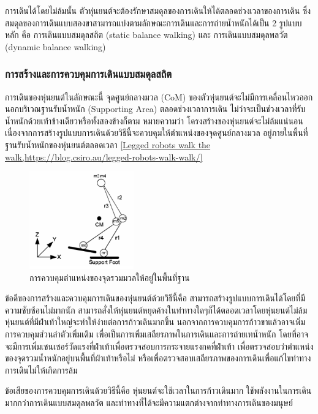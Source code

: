 การเดินได้โดยไม่ล้มนั้น ตัวหุ่นยนต์จะต้องรักษาสมดุลของการเดินให้ได้ตลอดช่วงเวลาของการเดิน
ซึ่งสมดุลของการเดินแบบสองขาสามารถแบ่งตามลักษณะการเดินและการถ่ายน้ำหนักได้เป็น 2 รูปแบบหลัก คือ 
การเดินแบบสมดุลสถิต (static balance walking) และ การเดินแบบสมดุลพลวัต (dynamic balance walking)

\subsubsection{การสร้างและการควบคุมการเดินแบบสมดุลสถิต}
การเดินของหุ่นยนต์ในลักษณะนี้ จุดศูนย์กลางมวล (CoM) ของตัวหุ่นยนต์จะไม่มีการเคลื่อนไหวออกนอกบริเวณฐานรับน้ำหนัก (Supporting Area)
ตลอดช่วงเวลาการเดิน ไม่ว่าจะเป็นช่วงเวลาที่รับน้ำหนักด้วยเท้าข้างเดียวหรือทั้งสองข้างก็ตาม หมายความว่า โครงสร้างของหุ่นยนต์จะไม่ล้มแน่นอน
เนื่องจากการสร้างรูปแบบการเดินด้วยวิธีนี้จะควบคุมให้ตำแหน่งของจุดศูนย์กลางมวล อยู่ภายในพื้นที่ฐานรับน้ำหนักของหุ่นยนต์ตลอดเวลา
\ref{Legged robots walk the walk,https://blog.csiro.au/legged-robots-walk-walk/}

\begin{figure}[ht]
	\centering
	\includegraphics[width=0.4\textwidth]{chapter2/images/cominsupportpolygon.png}
	\caption{การควบคุมตำแหน่งของจุดรวมมวลให้อยู่ในพื้นที่ฐาน}
	\label{fig:robot_com_support}
\end{figure}

ข้อดีของการสร้างและควบคุมการเดินของหุ่นยนต์ด้วยวิธีนี้คือ สามารถสร้างรูปแบบการเดินได้โดยที่มีความซับซ้อนไม่มากนัก
สามารถสั่งให้หุ่นยนต์หยุดค้างในท่าทางใดๆก็ได้ตลอดเวลาโดยหุ่นยนต์ไม่ล้ม หุ่นยนต์ที่มีฝ่าเท้าใหญ่จะทำให้ง่ายต่อการก้าวเดินมากขึ้น
นอกจากการควบคุมการก้าวขาแล้วอาจเพิ่มการควบคุมส่วนลำตัวเพิ่มเติม เพื่อเป็นการเพิ่มเสถียรภาพในการเดินและการถ่ายเทน้ำหนัก
โดยที่อาจจะมีการเพิ่มเซนเซอร์วัดแรงที่ฝ่าเท้าเพื่อตรวจสอบการกระจายแรงกดที่ฝ่าเท้า เพื่อตรวจสอบว่าตำแหน่งของจุดรวมน้ำหนักอยู่บนพื้นที่ฝ่าเท้าหรือไม่
หรือเพื่อตรวจสอบเสถียรภาพของการเดินเพื่อแก้ไขท่าทางการเดินไม่ให้เกิดการล้ม

ข้อเสียของการควบคุมการเดินด้วยวิธีนี้คือ หุ่นยนต์จะใช้เวลาในการก้าวเดินมาก ใช้พลังงานในการเดินมากกว่าการเดินแบบสมดุลพลวัต
และท่าทางที่ได้จะมีความแตกต่างจากท่าทางการเดินของมนุษย์

